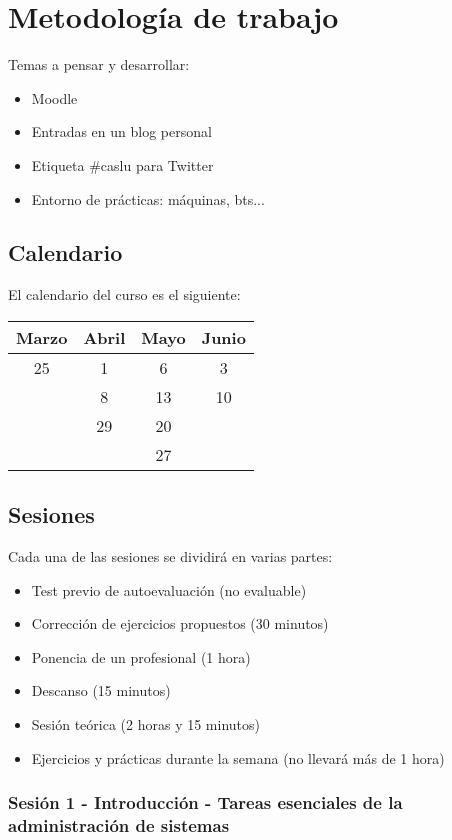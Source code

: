 \documentclass[a4paper]{article}
\begin{document}
  \section{Metodología de trabajo}
    Temas a pensar y desarrollar:
    \begin{itemize}
      \item Moodle
      \item Entradas en un blog personal
      \item Etiqueta \#caslu para Twitter
      \item Entorno de prácticas: máquinas, bts...
    \end{itemize}
    \subsection{Calendario}
    El calendario del curso es el siguiente: 

\medskip

    \begin{tabular}{| c | c | c | c |}
      \hline
      Marzo & Abril & Mayo & Junio \\
      \hline
      25 & 1 & 6 & 3 \\
      & 8 & 13 & 10 \\
      & 29 & 20 & \\
      & & 27 & \\
      \hline
    \end{tabular}

    \subsection{Sesiones}
      Cada una de las sesiones se dividirá en varias partes:
      \begin{itemize}
        \item Test previo de autoevaluación (no evaluable)
        \item Corrección de ejercicios propuestos (30 minutos)
        \item Ponencia de un profesional (1 hora)
        \item Descanso (15 minutos)
        \item Sesión teórica (2 horas y 15 minutos)
        \item Ejercicios y prácticas durante la semana (no llevará más de 1 hora)
      \end{itemize}

      \subsubsection{Sesión 1 - Introducción - Tareas esenciales de la administración de sistemas}
         
\end{document}
